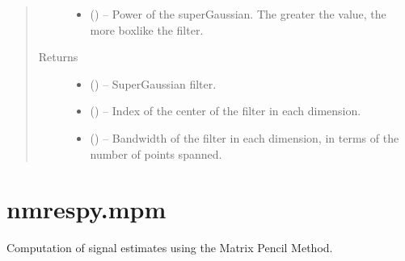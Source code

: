 \documentclass[letterpaper,10pt,english]{sphinxmanual}
\begin{document}
\begin{fulllineitems}
\begin{quote}
\begin{description}
\begin{itemize}
\item {} 
\sphinxAtStartPar
{} (\sphinxstyleliteralemphasis{\sphinxupquote{, }}) – Power of the super\sphinxhyphen{}Gaussian. The greater the value, the more box\sphinxhyphen{}like
the filter.

\end{itemize}

\item[{Returns}] \leavevmode
\sphinxAtStartPar
\begin{itemize}
\item {} 
\sphinxAtStartPar
{} () – Super\sphinxhyphen{}Gaussian filter.

\item {} 
\sphinxAtStartPar
{} () – Index of the center of the filter in each dimension.

\item {} 
\sphinxAtStartPar
{} () – Bandwidth of the filter in each dimension, in terms of the number
of points spanned.

\end{itemize}


\end{description}\end{quote}

\end{fulllineitems}





\section{nmrespy.mpm}
\label{\detokenize{references/mpm:module-nmrespy.mpm}}\label{\detokenize{references/mpm:nmrespy-mpm}}\label{\detokenize{references/mpm::doc}}
\sphinxAtStartPar
Computation of signal estimates using the Matrix Pencil Method.
\end{document}
